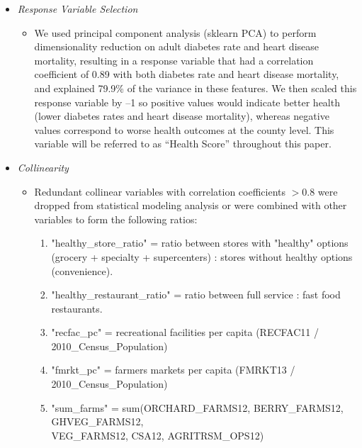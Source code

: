 \documentclass{article}
\begin{document}
\begin{itemize}[leftmargin=0pt]
\begin{itemize}
\item[] \textit{Response Variable Selection}
\begin{itemize}
    \item[] We used principal component analysis (sklearn PCA) to perform dimensionality reduction on adult diabetes rate and heart disease mortality, resulting in a response variable that had a correlation coefficient of 0.89 with both diabetes rate and heart disease mortality, and explained 79.9\% of the variance in these features. We then scaled this response variable by –1 so positive values would indicate better health (lower diabetes rates and heart disease mortality), whereas negative values correspond to worse health outcomes at the county level. This variable will be referred to as “Health Score” throughout this paper. 
\end{itemize}

\item[] \textit{Collinearity}
\begin{itemize}
    \item[] Redundant collinear variables with correlation coefficients $>$0.8 were dropped from statistical modeling analysis or were combined with other variables to form the following ratios: 

    \begin{enumerate}
        \item "healthy\_store\_ratio" = ratio between stores with "healthy" options (grocery + specialty + supercenters) : stores without healthy options (convenience).
        \item "healthy\_restaurant\_ratio" = ratio between full service : fast food restaurants. 
        \item "recfac\_pc" = recreational facilities per capita (RECFAC11 / 2010\_Census\_Population) 
        \item "fmrkt\_pc" = farmers markets per capita (FMRKT13 / 2010\_Census\_Population)
        \item "sum\_farms" = sum(ORCHARD\_FARMS12, BERRY\_FARMS12, GHVEG\_FARMS12,\\ VEG\_FARMS12, CSA12, AGRITRSM\_OPS12) 
    \end{enumerate}
\end{itemize}


\end{itemize}
\end{itemize}
\end{document}
